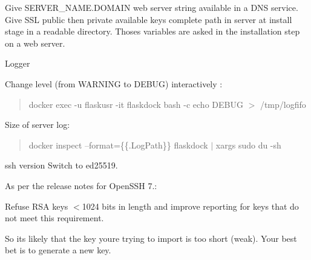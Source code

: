 Give SERVER\+\_\+\+NAME.\+DOMAIN web server string available in a DNS service. ~\newline
 Give SSL public then private available keys complete path in server at install stage in a readable directory. Thoses variables are asked in the installation step on a web server.


\begin{DoxyEnumerate}
\item Logger
\end{DoxyEnumerate}

Change level (from WARNING to DEBUG) interactively :\+ \begin{quote}
docker exec -\/u flaskusr -\/it flaskdock bash -\/c \textquotesingle{}echo DEBUG \texorpdfstring{$>$}{>} /\+tmp/\+logfifo\textquotesingle{} \end{quote}


Size of server log:\+ \begin{quote}
docker inspect --format=\textquotesingle{}\{\{.Log\+Path\}\}\textquotesingle{} flaskdock \texorpdfstring{$\vert$}{|} xargs sudo du -\/sh \end{quote}



\begin{DoxyEnumerate}
\item ssh version Switch to ed25519.
\end{DoxyEnumerate}

As per the release notes for Open\+SSH 7.:\+

Refuse RSA keys \texorpdfstring{$<$}{<}1024 bits in length and improve reporting for keys that do not meet this requirement.

So it\textquotesingle{}s likely that the key you\textquotesingle{}re trying to import is too short (weak). Your best bet is to generate a new key. 